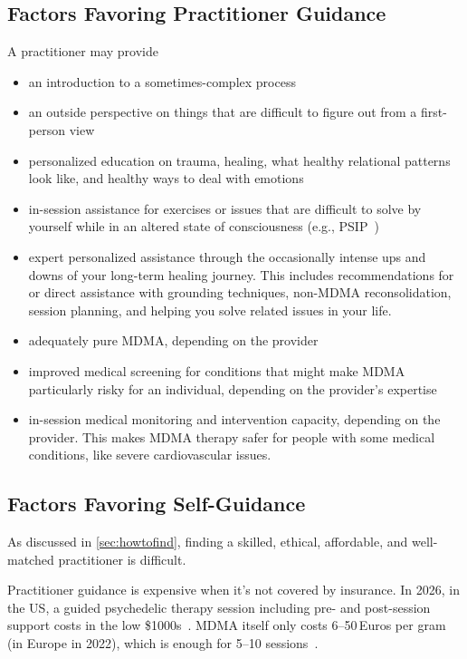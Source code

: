 \documentclass[11pt,oneside]{book}
\let\cite\parencite
\begin{document}
\subsection*{Factors Favoring Practitioner Guidance}
A practitioner may provide
\begin{itemize}
    \item an introduction to a sometimes-complex process
    \item an outside perspective on things that are difficult to figure out from a first-person view
    \item personalized education on trauma, healing, what healthy relational patterns look like, and healthy ways to deal with emotions
    \item in-session assistance for exercises or issues that are difficult to solve by yourself while in an altered state of consciousness (e.g., PSIP~\cite{razviPSIP})
    \item expert personalized assistance through the occasionally intense ups and downs of your long-term healing journey. This includes recommendations for or direct assistance with grounding techniques, non-MDMA reconsolidation, session planning, and helping you solve related issues in your life.
    \item adequately pure MDMA, depending on the provider
    \item improved medical screening for conditions that might make MDMA particularly risky for an individual, depending on the provider's expertise
    \item in-session medical monitoring and intervention capacity, depending on the provider. This makes MDMA therapy safer for people with some medical conditions, like severe cardiovascular issues.
\end{itemize}

\subsection*{Factors Favoring Self-Guidance}
As discussed in \cref{sec:howtofind}, finding a skilled, ethical, affordable, and well-matched practitioner is difficult.

Practitioner guidance is expensive when it's not covered by insurance. In 2026, in the US, a guided psychedelic therapy session including pre- and post-session support costs in the low \$1000s~\cite{cost1,cost2,cost3}. MDMA itself only costs 6--50\,Euros per gram (in Europe in 2022), which is enough for 5--10 sessions~\cite{euMDMA}.
\end{document}

